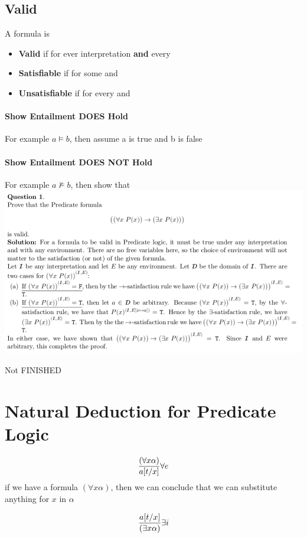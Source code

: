 \documentclass{report}
\begin{document}
\subsection{Valid}
\begin{defbox}
A formula \vfi is
\begin{itemize}
\item \textbf{Valid} if \iep for ever interpretation \vmi \textbf{and} every \ee
\item \textbf{Satisfiable} if \iep  for some \ii and \ee
\item \textbf{Unsatisfiable} if \niep  for every \ii and \ee
\end{itemize}
\end{defbox}
\paragraph{Show Entailment DOES Hold} For example $a\vDash b$, then assume a is true and b is false
\paragraph{Show Entailment DOES NOT Hold} For example $a\nvDash b$, then show that \\
\includegraphics[width=\textwidth]{ex1} 

Not FINISHED

\section{Natural Deduction for Predicate Logic}

\begin{defbox}
$${{(\forall x \alpha)}\over {a[t/x]}}\forall e$$
if we have a formula $(\forall x \alpha)$, then we can conclude that we can substitute anything for $x$ in $\alpha$
\end{defbox}
\begin{defbox}
$${{a[t/x]}\over {(\exists x \alpha)}}\exists i$$

\end{defbox}
\end{document}
